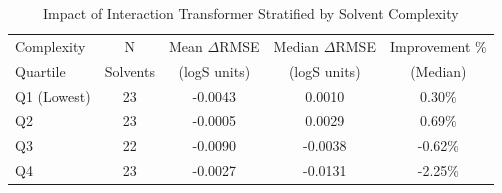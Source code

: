 
\begin{table}[htbp]
\centering
\caption{Impact of Interaction Transformer Stratified by Solvent Complexity}
\label{tab:complexity_stratified}
\begin{tabular}{lcccc}
\toprule
Complexity & N & Mean $\Delta$RMSE & Median $\Delta$RMSE & Improvement \% \\
Quartile & Solvents & (logS units) & (logS units) & (Median) \\
\midrule
Q1 (Lowest) & 23 & -0.0043 & 0.0010 & 0.30\% \\
Q2 & 23 & -0.0005 & 0.0029 & 0.69\% \\
Q3 & 22 & -0.0090 & -0.0038 & -0.62\% \\
Q4 & 23 & -0.0027 & -0.0131 & -2.25\% \\
\bottomrule
\end{tabular}
\end{table}
